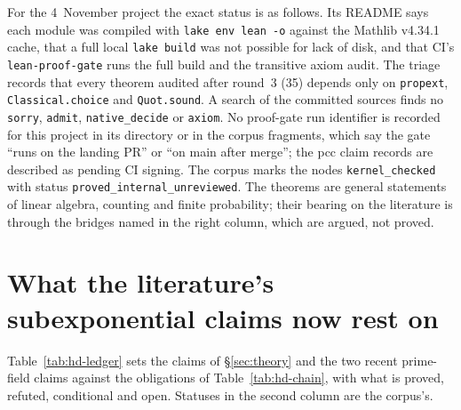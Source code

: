 For the 4~November project the exact status is as follows. Its README says
each module was compiled with \texttt{lake env lean -o} against the Mathlib
v4.34.1 cache, that a full local \texttt{lake build} was not possible for lack
of disk, and that CI's \texttt{lean-proof-gate} runs the full build and the
transitive axiom audit. The triage records that every theorem audited after
round~3 (35) depends only on \texttt{propext}, \texttt{Classical.choice} and
\texttt{Quot.sound}. A search of the committed sources finds no
\texttt{sorry}, \texttt{admit}, \texttt{native\_decide} or \texttt{axiom}.
No proof-gate run identifier is recorded for this project in its directory or
in the corpus fragments, which say the gate ``runs on the landing PR'' or
``on main after merge''; the pcc claim records are described as pending CI
signing. The corpus marks the nodes \texttt{kernel\_checked} with status
\texttt{proved\_internal\_unreviewed}. The theorems are general statements
of linear algebra, counting and finite probability; their bearing on the
literature is through the bridges named in the right column, which are
argued, not proved.

\section{What the literature's subexponential claims now rest on}\label{sec:hd-ledger}

Table~\ref{tab:hd-ledger} sets the claims of \S\ref{sec:theory} and the two
recent prime-field claims against the obligations of
Table~\ref{tab:hd-chain}, with what is proved, refuted, conditional and open.
Statuses in the second column are the corpus's.

